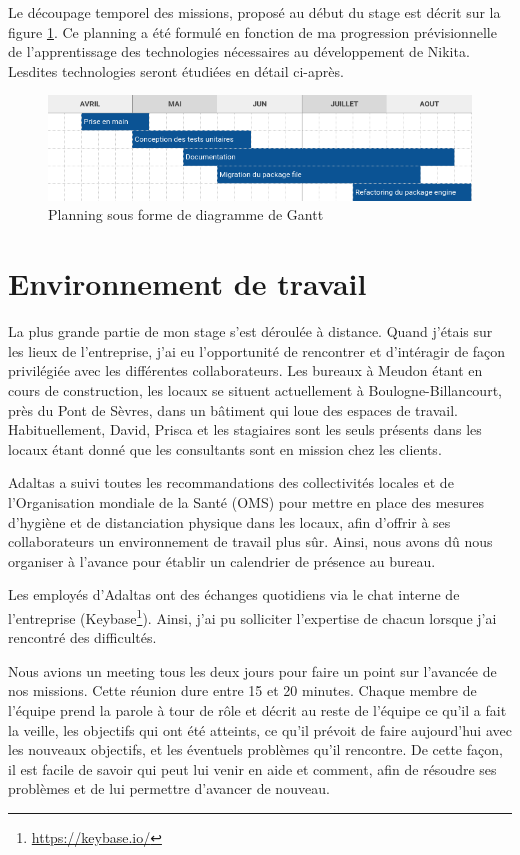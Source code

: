 \documentclass[12pt, french]{report}
\begin{document}
Le découpage temporel des missions, proposé au début du stage est décrit sur la figure \ref{fig:planning}. Ce planning a été formulé en fonction de ma progression prévisionnelle de l'apprentissage des technologies nécessaires au développement de Nikita. Lesdites technologies seront étudiées en détail ci-après.

\begin{figure}[h]
\includegraphics[scale=0.6]{assets/img/planning.png}
\centering
\caption{Planning sous forme de diagramme de Gantt}
\label{fig:planning}
\end{figure}

\section{Environnement de travail}

La plus grande partie de mon stage s'est déroulée à distance. Quand j'étais sur les lieux de l'entreprise, j'ai eu l'opportunité de rencontrer et d'intéragir de façon privilégiée avec les différentes collaborateurs. Les bureaux à Meudon étant en cours de construction, les locaux se situent actuellement à Boulogne-Billancourt, près du Pont de Sèvres, dans un bâtiment qui loue des espaces de travail. Habituellement, David, Prisca et les stagiaires sont les seuls présents dans les locaux étant donné que les consultants sont en mission chez les clients.

Adaltas a suivi toutes les recommandations des collectivités locales et de l’Organisation mondiale de la Santé (OMS) pour mettre en place des mesures d’hygiène et de distanciation physique dans les locaux, afin d’offrir à ses collaborateurs un environnement de travail plus sûr. Ainsi, nous avons dû nous organiser à l'avance pour établir un calendrier de présence au bureau.

Les employés d’Adaltas ont des échanges quotidiens via le chat interne de l’entreprise (Keybase\footnote{\href{https://keybase.io/}{https://keybase.io/}}). Ainsi, j'ai pu solliciter l'expertise de chacun lorsque j'ai rencontré des difficultés.

Nous avions un meeting tous les deux jours pour faire un point sur l'avancée de nos missions. Cette réunion dure entre 15 et 20 minutes. Chaque membre de l'équipe prend la parole à tour de rôle et décrit au reste de l’équipe ce qu’il a fait la veille, les objectifs qui ont été atteints, ce qu’il prévoit de faire aujourd’hui avec les nouveaux objectifs, et les éventuels problèmes qu’il rencontre. De cette façon, il est facile de savoir qui peut lui venir en aide et comment, afin de résoudre ses problèmes et de lui permettre d’avancer de nouveau.
\end{document}
